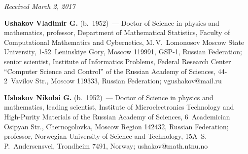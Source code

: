 \vspace*{-3pt}

\hfill{\small\textit{Received March 2, 2017}}


\Contr



\noindent
\textbf{Ushakov Vladimir G.} (b.\ 1952)~--- 
Doctor of Science in physics and mathematics, professor, Department of Mathematical 
Statistics, Faculty of Computational Mathematics and Cybernetics, M.\,V.~Lomonosov 
Moscow State University, 1-52~Leninskiye Gory, Moscow 119991, GSP-1, 
Russian Federation; senior scientist, Institute of Informatics Problems, 
Federal Research Center ``Computer Science and Control'' 
of the Russian Academy of Sciences, 44-2~Vavilov Str., Moscow 119333, Russian Federation; 
\mbox{vgushakov@mail.ru}

\vspace*{3pt}

\noindent
\textbf{Ushakov Nikolai G.} (b.\ 1952)~--- 
Doctor of Science in physics and mathematics, leading scientist, Institute of 
Microelectronics Technology and High-Purity Materials of the Russian Academy of 
Sciences, 6~Academician Osipyan Str., Chernogolovka, Moscow Region 142432, 
Russian Federation; professor, Norwegian University of Science and Technology, 
15A~S.\,P.~Andersensvei, Trondheim 7491, Norway; \mbox{ushakov@math.ntnu.no}


\label{end\stat}


\renewcommand{\bibname}{\protect\rm Литература} 